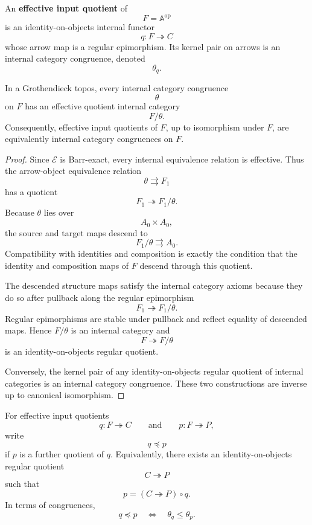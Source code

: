 \begin{definition}
\label{def:eilenberg-effective-input-quotient}
An \textbf{effective input quotient} of
\[
F=\mathbb A^{\mathrm{op}}
\]
is an identity-on-objects internal functor
\[
q:F\twoheadrightarrow C
\]
whose arrow map is a regular epimorphism. Its kernel pair on arrows is an
internal category congruence, denoted
\[
\theta_q.
\]
\end{definition}

\begin{proposition}
\label{prop:eilenberg-congruences-effective-quotients}
In a Grothendieck topos, every internal category congruence
\[
\theta
\]
on \(F\) has an effective quotient internal category
\[
F/\theta.
\]
Consequently, effective input quotients of \(F\), up to isomorphism under
\(F\), are equivalently internal category congruences on \(F\).
\end{proposition}

\begin{proof}
Since \(\mathcal E\) is Barr-exact, every internal equivalence relation is
effective. Thus the arrow-object equivalence relation
\[
\theta\rightrightarrows F_1
\]
has a quotient
\[
F_1\twoheadrightarrow F_1/\theta.
\]
Because \(\theta\) lies over
\[
A_0\times A_0,
\]
the source and target maps descend to
\[
F_1/\theta\rightrightarrows A_0.
\]
Compatibility with identities and composition is exactly the condition that
the identity and composition maps of \(F\) descend through this quotient.

The descended structure maps satisfy the internal category axioms because
they do so after pullback along the regular epimorphism
\[
F_1\twoheadrightarrow F_1/\theta.
\]
Regular epimorphisms are stable under pullback and reflect equality of
descended maps. Hence \(F/\theta\) is an internal category and
\[
F\twoheadrightarrow F/\theta
\]
is an identity-on-objects regular quotient.

Conversely, the kernel pair of any identity-on-objects regular quotient of
internal categories is an internal category congruence. These two
constructions are inverse up to canonical isomorphism.
\end{proof}

\begin{definition}
\label{def:eilenberg-quotient-order}
For effective input quotients
\[
q:F\twoheadrightarrow C
\qquad\text{and}\qquad
p:F\twoheadrightarrow P,
\]
write
\[
q\preceq p
\]
if \(p\) is a further quotient of \(q\). Equivalently, there exists an
identity-on-objects regular quotient
\[
C\twoheadrightarrow P
\]
such that
\[
p=(C\twoheadrightarrow P)\circ q.
\]
In terms of congruences,
\[
q\preceq p
\quad\Longleftrightarrow\quad
\theta_q\leq\theta_p.
\]
\end{definition}

